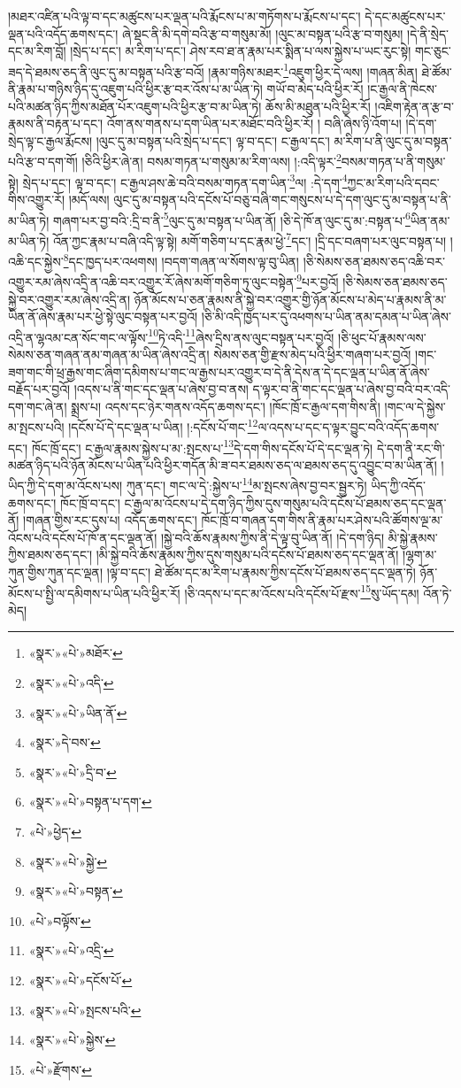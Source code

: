 །མཐར་འཛིན་པའི་ལྟ་བ་དང་མཚུངས་པར་ལྡན་པའི་རྨོངས་པ་མ་གཏོགས་པ་རྨོངས་པ་དང་། དེ་དང་མཚུངས་པར་ལྡན་པའི་འདོད་ཆགས་དང་། ཞེ་སྡང་ནི་མི་དགེ་བའི་རྩ་བ་གསུམ་མོ། །ལུང་མ་བསྟན་པའི་རྩ་བ་གསུམ། །དེ་ནི་སྲེད་དང་མ་རིག་བློ། །སྲེད་པ་དང་། མ་རིག་པ་དང་། ཤེས་རབ་ཐ་ན་རྣམ་པར་སྨིན་པ་ལས་སྐྱེས་པ་ཡང་རུང་སྟེ། གང་ཅུང་ཟད་དེ་ཐམས་ཅད་ནི་ལུང་དུ་མ་བསྟན་པའི་རྩ་བའོ། །རྣམ་གཉིས་མཐར་\footnote{«སྣར་»«པེ་»མཐོར་}འཇུག་ཕྱིར་དེ་ལས། །གཞན་མིན། ཐེ་ཚོམ་ནི་རྣམ་པ་གཉིས་ཉིད་དུ་འཇུག་པའི་ཕྱིར་རྩ་བར་འོས་པ་མ་ཡིན་ཏེ། གཡོ་བ་མེད་པའི་ཕྱིར་རོ། །ང་རྒྱལ་ནི་ཁེངས་པའི་མཚན་ཉིད་ཀྱིས་མཐོན་པོར་འཇུག་པའི་ཕྱིར་རྩ་བ་མ་ཡིན་ཏེ། ཆོས་མི་མཐུན་པའི་ཕྱིར་རོ། །འཇིག་རྟེན་ན་རྩ་བ་རྣམས་ནི་བརྟན་པ་དང་། འོག་ནས་གནས་པ་དག་ཡིན་པར་མཐོང་བའི་ཕྱིར་རོ། །
བཞི་ཞེས་ཉི་འོག་པ། །དེ་དག་སྲེད་ལྟ་ང་རྒྱལ་རྨོངས། །ལུང་དུ་མ་བསྟན་པའི་སྲེད་པ་དང་། ལྟ་བ་དང་། ང་རྒྱལ་དང་། མ་རིག་པ་ནི་ལུང་དུ་མ་བསྟན་པའི་རྩ་བ་དག་གོ། །ཅིའི་ཕྱིར་ཞེ་ན། བསམ་གཏན་པ་གསུམ་མ་རིག་ལས། །:འདི་ལྟར་\footnote{«སྣར་»«པེ་»འདི་}བསམ་གཏན་པ་ནི་གསུམ་སྟེ། སྲེད་པ་དང་། ལྟ་བ་དང་། ང་རྒྱལ་ཤས་ཆེ་བའི་བསམ་གཏན་དག་ཡིན་\footnote{«སྣར་»«པེ་»ཡིན་ནོ་}ལ། :དེ་དག་\footnote{«སྣར་»དེ་བས་}ཀྱང་མ་རིག་པའི་དབང་གིས་འགྱུར་རོ། །མདོ་ལས། ལུང་དུ་མ་བསྟན་པའི་དངོས་པོ་བཅུ་བཞི་གང་གསུངས་པ་དེ་དག་ལུང་དུ་མ་བསྟན་པ་ནི་མ་ཡིན་ཏེ། གཞག་པར་བྱ་བའི་:དྲི་བ་ནི་\footnote{«སྣར་»«པེ་»དྲི་བ་}ལུང་དུ་མ་བསྟན་པ་ཡིན་ནོ། །ཅི་དེ་ཁོ་ན་ལུང་དུ་མ་:བསྟན་པ་\footnote{«སྣར་»«པེ་»བསྟན་པ་དག་}ཡིན་ནམ་མ་ཡིན་ཏེ། འོན་ཀྱང་རྣམ་པ་བཞི་འདི་ལྟ་སྟེ། མགོ་གཅིག་པ་དང་རྣམ་ཕྱེ་\footnote{«པེ་»ཕྱེད་}དང་། །དྲི་དང་བཞག་པར་ལུང་བསྟན་པ། །འཆི་དང་སྐྱེས་\footnote{«སྣར་»«པེ་»སྐྱེ་}དང་ཁྱད་པར་འཕགས། །བདག་གཞན་ལ་སོགས་ལྟ་བུ་ཡིན། །ཅི་སེམས་ཅན་ཐམས་ཅད་འཆི་བར་འགྱུར་རམ་ཞེས་འདྲི་ན་འཆི་བར་འགྱུར་རོ་ཞེས་མགོ་གཅིག་ཏུ་ལུང་བསྟེན་\footnote{«སྣར་»«པེ་»བསྟན་}པར་བྱའོ། །ཅི་སེམས་ཅན་ཐམས་ཅད་སྐྱེ་བར་འགྱུར་རམ་ཞེས་འདྲི་ན། ཉོན་མོངས་པ་ཅན་རྣམས་ནི་སྐྱེ་བར་འགྱུར་གྱི་ཉོན་མོངས་པ་མེད་པ་རྣམས་ནི་མ་ཡིན་ནོ་ཞེས་རྣམ་པར་ཕྱེ་སྟེ་ལུང་བསྟན་པར་བྱའོ། །ཅི་མི་འདི་ཁྱད་པར་དུ་འཕགས་པ་ཡིན་ནམ་དམན་པ་ཡིན་ཞེས་འདྲི་ན་ལྷའམ་ངན་སོང་གང་ལ་ལྟོས་\footnote{«པེ་»བལྟོས་}ཏེ་འདི་\footnote{«སྣར་»«པེ་»འདྲི་}ཞེས་དྲིས་ནས་ལུང་བསྟན་པར་བྱའོ། །ཅི་ཕུང་པོ་རྣམས་ལས་སེམས་ཅན་གཞན་ནམ་གཞན་མ་ཡིན་ཞེས་འདྲི་ན། སེམས་ཅན་གྱི་རྫས་མེད་པའི་ཕྱིར་གཞག་པར་བྱའོ། །གང་ཟག་གང་གི་ཕྲ་རྒྱས་གང་ཞིག་དམིགས་པ་གང་ལ་རྒྱས་པར་འགྱུར་བ་དེ་ནི་དེས་ན་དེ་དང་ལྡན་པ་ཡིན་ནོ་ཞེས་བརྗོད་པར་བྱའོ། །འདས་པ་ནི་གང་དང་ལྡན་པ་ཞེས་བྱ་བ་ནས། ད་ལྟར་བ་ནི་གང་དང་ལྡན་པ་ཞེས་བྱ་བའི་བར་འདི་དག་གང་ཞེ་ན། སྨྲས་པ། འདས་དང་ཉེར་གནས་འདོད་ཆགས་དང་། །ཁོང་ཁྲོ་ང་རྒྱལ་དག་གིས་ནི། །གང་ལ་དེ་སྐྱེས་མ་སྤངས་པའི། །དངོས་པོ་དེ་དང་ལྡན་པ་ཡིན། །:དངོས་པོ་གང་\footnote{«སྣར་»«པེ་»དངོས་པོ་}ལ་འདས་པ་དང་ད་ལྟར་བྱུང་བའི་འདོད་ཆགས་དང་། ཁོང་ཁྲོ་དང་། ང་རྒྱལ་རྣམས་སྐྱེས་པ་མ་:སྤངས་པ་\footnote{«སྣར་»«པེ་»སྤངས་པའི་}དེ་དག་གིས་དངོས་པོ་དེ་དང་ལྡན་ཏེ། དེ་དག་ནི་རང་གི་མཚན་ཉིད་པའི་ཉོན་མོངས་པ་ཡིན་པའི་ཕྱིར་གདོན་མི་ཟ་བར་ཐམས་ཅད་ལ་ཐམས་ཅད་དུ་འབྱུང་བ་མ་ཡིན་ནོ། །ཡིད་ཀྱི་དེ་དག་མ་འོངས་པས། ཀུན་དང་། གང་ལ་དེ་:སྐྱེས་པ་\footnote{«སྣར་»«པེ་»སྐྱེས་}མ་སྤངས་ཞེས་བྱ་བར་སྦྱར་ཏེ། ཡིད་ཀྱི་འདོད་ཆགས་དང་། ཁོང་ཁྲོ་བ་དང་། ང་རྒྱལ་མ་འོངས་པ་དེ་དག་ཉིད་ཀྱིས་དུས་གསུམ་པའི་དངོས་པོ་ཐམས་ཅད་དང་ལྡན་ནོ། །གཞན་གྱིས་རང་དུས་པ། འདོད་ཆགས་དང་། ཁོང་ཁྲོ་བ་གཞན་དག་གིས་ནི་རྣམ་པར་ཤེས་པའི་ཚོགས་ལྔ་མ་འོངས་པའི་དངོས་པོ་ཁོ་ན་དང་ལྡན་ནོ། །སྐྱེ་བའི་ཆོས་རྣམས་ཀྱིས་ནི་དེ་ལྟ་བུ་ཡིན་ནོ། །དེ་དག་ཉིད། མི་སྐྱེ་རྣམས་ཀྱིས་ཐམས་ཅད་དང་། །མི་སྐྱེ་བའི་ཆོས་རྣམས་ཀྱིས་དུས་གསུམ་པའི་དངོས་པོ་ཐམས་ཅད་དང་ལྡན་ནོ། །ལྷག་མ་ཀུན་གྱིས་ཀུན་དང་ལྡན། །ལྟ་བ་དང་། ཐེ་ཚོམ་དང་མ་རིག་པ་རྣམས་ཀྱིས་དངོས་པོ་ཐམས་ཅད་དང་ལྡན་ཏེ། ཉོན་མོངས་པ་སྤྱི་ལ་དམིགས་པ་ཡིན་པའི་ཕྱིར་རོ། །ཅི་འདས་པ་དང་མ་འོངས་པའི་དངོས་པོ་རྫས་\footnote{«པེ་»རྫོགས་}སུ་ཡོད་དམ། འོན་ཏེ་མེད། 